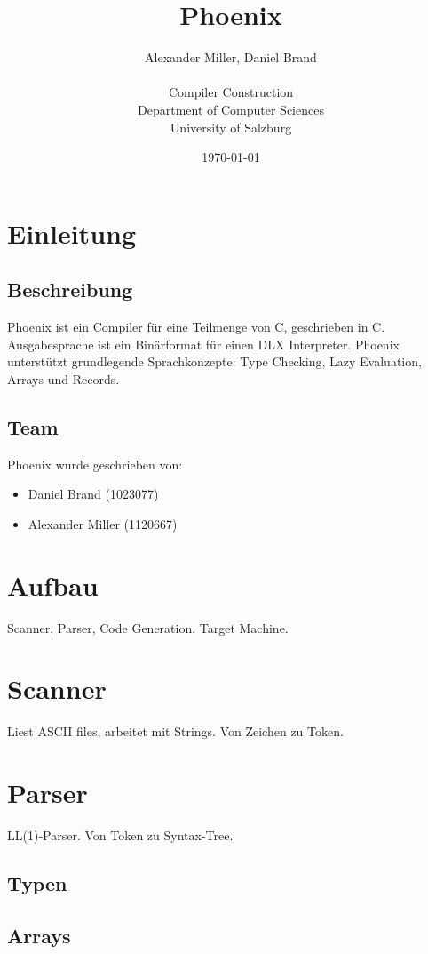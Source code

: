 \documentclass{article}
\title{Phoenix}
\author{Alexander Miller, Daniel Brand \\ \\
		Compiler Construction \\
		Department of Computer Sciences \\
		University of Salzburg}
\date{\today}
\begin{document}
	\maketitle
	\tableofcontents

	\section{Einleitung}
	\subsection{Beschreibung}
	Phoenix ist ein Compiler für eine Teilmenge von C, geschrieben in C.
	Ausgabesprache ist ein Binärformat für einen DLX Interpreter.
	Phoenix unterstützt grundlegende Sprachkonzepte: Type Checking, Lazy Evaluation, Arrays und Records.
	\subsection{Team}
	Phoenix wurde geschrieben von:
	\begin{itemize}
		\item Daniel Brand (1023077)
		\item Alexander Miller (1120667)
	\end{itemize}

	\section{Aufbau}
	Scanner, Parser, Code Generation. Target Machine.

	\section{Scanner}
	Liest ASCII files, arbeitet mit Strings. Von Zeichen zu Token.

	\section{Parser}
	LL(1)-Parser. Von Token zu Syntax-Tree.

	\subsection{Typen}

	\subsection{Arrays}
\end{document}
